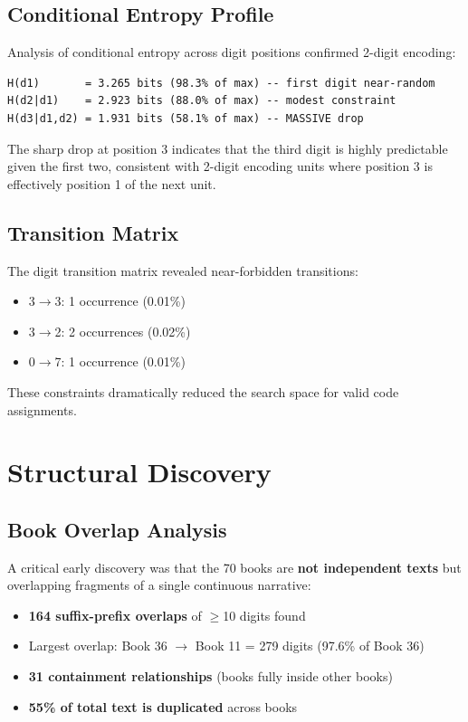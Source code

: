 \documentclass[11pt,a4paper]{article}
\begin{document}
\subsection{Conditional Entropy Profile}

Analysis of conditional entropy across digit positions confirmed 2-digit encoding:

\begin{lstlisting}[style=plain]
H(d1)       = 3.265 bits (98.3% of max) -- first digit near-random
H(d2|d1)    = 2.923 bits (88.0% of max) -- modest constraint
H(d3|d1,d2) = 1.931 bits (58.1% of max) -- MASSIVE drop
\end{lstlisting}

The sharp drop at position 3 indicates that the third digit is highly predictable given the first two, consistent with 2-digit encoding units where position 3 is effectively position 1 of the next unit.

\subsection{Transition Matrix}

The digit transition matrix revealed near-forbidden transitions:
\begin{itemize}
\item 3$\rightarrow$3: 1 occurrence (0.01\%)
\item 3$\rightarrow$2: 2 occurrences (0.02\%)
\item 0$\rightarrow$7: 1 occurrence (0.01\%)
\end{itemize}

These constraints dramatically reduced the search space for valid code assignments.

\section{Structural Discovery}

\subsection{Book Overlap Analysis}

A critical early discovery was that the 70 books are \textbf{not independent texts} but overlapping fragments of a single continuous narrative:

\begin{itemize}
\item \textbf{164 suffix-prefix overlaps} of $\geq$10 digits found
\item Largest overlap: Book 36 $\rightarrow$ Book 11 = 279 digits (97.6\% of Book 36)
\item \textbf{31 containment relationships} (books fully inside other books)
\item \textbf{55\% of total text is duplicated} across books
\end{itemize}
\end{document}
